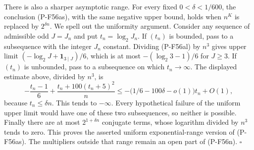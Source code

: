 There is also a sharper asymptotic range. For every fixed
$0<\delta<1/600$, the conclusion (P-F56as), with the
same negative upper bound, holds when $n^K$ is replaced
by $2^{\delta n}$. We spell out the uniformity argument.
Consider any sequence of admissible odd $J=J_n$ and put
$t_n=\log_2J_n$. If $(t_n)$ is bounded, pass to a
subsequence with the integer $J_n$ constant. Dividing
(P-F56al) by $n^3$ gives upper limit
$(-\log_2J+\mathbf1_{3\mid J})/6$, which is at most
$-(\log_2 3-1)/6$ for $J\ge3$.
If $(t_n)$ is unbounded, pass to a subsequence on which
$t_n\to\infty$. The displayed estimate above, divided
by $n^3$, is
\[
 -\frac{t_n-1}{6}
        +\frac{t_n+100(t_n+5)^2}{n}
 \le-\bigl(1/6-100\delta-o(1)\bigr)t_n+O(1),
\]
because $t_n\le\delta n$. This tends to $-\infty$.
Every hypothetical failure of the uniform upper limit
would have one of these two subsequences, so neither
is possible. Finally there are at most $2^{1+\delta n}$
conjugate terms, whose logarithm divided by $n^3$ tends
to zero. This proves the asserted uniform exponential-range
version of (P-F56as). The multipliers outside that range
remain an open part of (P-F56n).
\hfill$\square$
